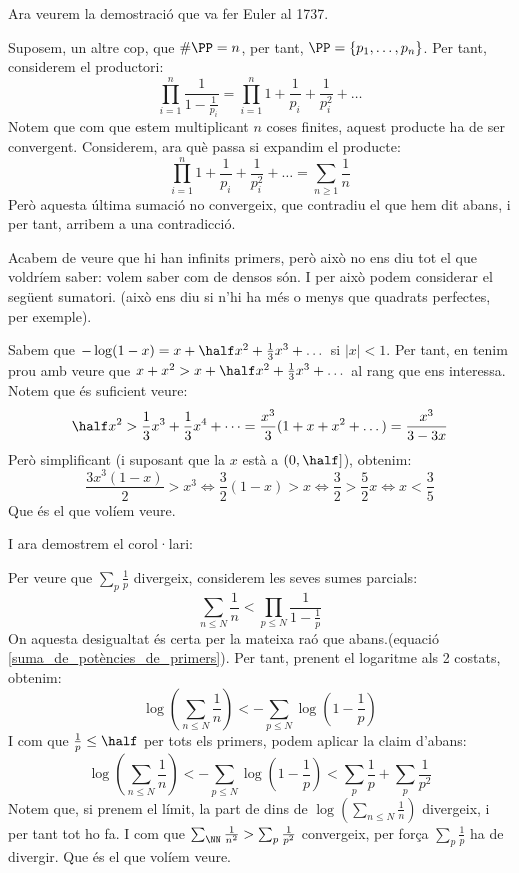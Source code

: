 Ara veurem la demostració que va fer Euler al  1737.
\begin{pf}
    Suposem, un altre cop, que $\# \PP=n$, per tant, $\PP=\{p_1,\dots,p_n\}$. Per tant, considerem el productori:
    \[\prod_{i=1}^n\frac{1}{1-\frac{1}{p_i}}=\prod_{i=1}^n1+\frac{1}{p_i}+\frac{1}{p_i^2}+\dots\]
    Notem que com que estem multiplicant $n$ coses finites, aquest producte ha de ser convergent. Considerem, ara què passa si expandim el producte:
    \begin{equation}
    \label{suma_de_potències_de_primers}
    \prod_{i=1}^n1+\frac{1}{p_i}+\frac{1}{p_i^2}+\dots=\sum_{n\geq1}\frac{1}{n}
    \end{equation}
    Però aquesta última sumació no convergeix, que contradiu el que hem dit abans, i per tant, arribem a una contradicció.
\end{pf}
Acabem de veure que hi han infinits primers, però això no ens diu tot el que voldríem saber: volem saber com de densos són. I per això podem considerar el següent sumatori. (això ens diu si n'hi ha més o menys que quadrats perfectes, per exemple).
\claim{Si $x\in(0,\half]$, aleshores $-\log(1-x)<x+x^2$}
\begin{pf}
    Sabem que $-\log(1-x)=x+\half x^2+\frac{1}{3}x^3+\dots$ si $|x|<1$. Per tant, en tenim prou amb veure que $x+x^2>x+\half x^2+\frac{1}{3}x^3+\dots$ al rang que ens interessa.\\
    Notem que és suficient veure:
    \[
    \half x^2>\frac{1}{3}x^3+\frac{1}{3}x^4+\dots=\frac{x^3}{3}(1+x+x^2+\dots)=\frac{x^3}{3-3x}
    \]
    Però simplificant (i suposant que la $x$ està a $(0,\half]$), obtenim:
    \[
    \frac{3x^3(1-x)}{2}>x^3\iff\frac{3}{2}(1-x)>x\iff\frac{3}{2}>\frac{5}{2}x\iff x<\frac{3}{5}
    \]
    Que és el que volíem veure.
\end{pf}
I ara demostrem el corol·lari:
\begin{pf}
    Per veure que $\sum_p\frac{1}{p}$ divergeix, considerem les seves sumes parcials:
    \[\sum_{n\leq N}\frac{1}{n}<\prod_{p\leq N}\frac{1}{1-\frac{1}{p}}\]
    On aquesta desigualtat és certa per la mateixa raó que abans.(equació \ref{suma_de_potències_de_primers}). Per tant, prenent el logaritme als 2 costats, obtenim:
    \[\log\left(\sum_{n\leq N}\frac{1}{n}\right)<-\sum_{p\leq N}\log\left(1-\frac{1}{p}\right)\]
    I com que $\frac{1}{p}\leq \half$ per tots els primers, podem aplicar la claim d'abans:\\
    \[\log\left(\sum_{n\leq N}\frac{1}{n}\right)<-\sum_{p\leq N}\log\left(1-\frac{1}{p}\right)<\sum_p\frac{1}{p}+\sum_p\frac{1}{p^2}\]
    Notem que, si prenem el límit, la part de dins de $\log\left(\sum_{n\leq N}\frac{1}{n}\right)$ divergeix, i per tant tot ho fa. I com que 
    $\sum_\NN\frac{1}{n^2}>\sum_p\frac{1}{p^2}$ convergeix, per força $\sum_p\frac{1}{p}$ ha de divergir. Que és el que volíem veure.
\end{pf}
